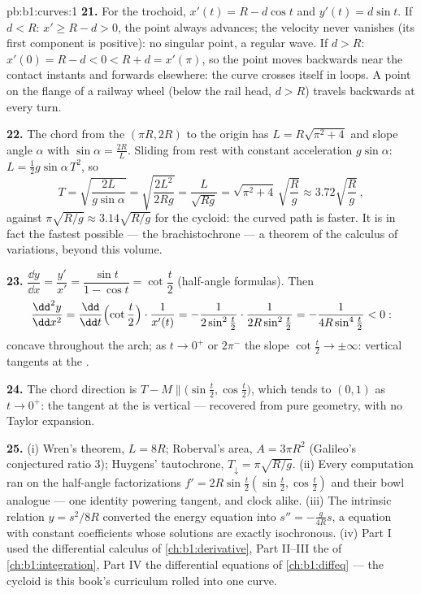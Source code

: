 \begin{solution}{pb:b1:curves:1}
\textbf{21.} For the trochoid, $x'(t) = R - d\cos t$ and $y'(t)
= d\sin t$. If $d < R$: $x' \geq R - d > 0$, the point always
advances; the velocity never vanishes (its first component is
positive): no singular point, a regular wave. If $d > R$: $x'(0)
= R - d < 0 < R + d = x'(\pi)$, so the point moves backwards
near the contact instants and forwards elsewhere: the curve
crosses itself in loops. A point on the flange of a railway
wheel (below the rail head, $d > R$) travels backwards at every
turn.

\textbf{22.} The chord from the  $(\pi R, 2R)$ to the origin
has  $L = R\sqrt{\pi^2 + 4}$ and slope angle $\alpha$ with
$\sin\alpha = \frac{2R}{L}$. Sliding from rest with constant
acceleration $g\sin\alpha$: $L = \frac12 g\sin\alpha\,T^2$, so
\[
T = \sqrt{\frac{2L}{g\sin\alpha}} = \sqrt{\frac{2L^2}{2Rg}}
= \frac{L}{\sqrt{Rg}} = \sqrt{\pi^2 + 4}\,\sqrt{\frac Rg}
\approx 3.72\sqrt{\frac Rg}\,,
\]
against $\pi\sqrt{R/g} \approx 3.14\sqrt{R/g}$ for the cycloid:
the curved path is faster. It is in fact the fastest possible
--- the brachistochrone --- a theorem of the calculus of
variations, beyond this volume.

\textbf{23.} $\dfrac{\dd y}{\dd x} = \dfrac{y'}{x'} =
\dfrac{\sin t}{1 - \cos t} = \cot\dfrac t2$ (half-angle
formulas). Then
\[
\frac{\dd^2y}{\dd x^2}
= \frac{\dd}{\dd t}\Bigl(\cot\frac t2\Bigr)\cdot\frac{1}{x'(t)}
= -\frac{1}{2\sin^2\frac t2}\cdot\frac{1}{2R\sin^2\frac t2}
= -\frac{1}{4R\sin^4\frac t2} < 0 :
\]
concave throughout the arch; as $t \to 0^+$ or $2\pi^-$ the
slope $\cot\frac t2 \to \pm\infty$: vertical tangents at the
.

\textbf{24.} The chord direction is $T - M \parallel
\bigl(\sin\frac t2, \cos\frac t2\bigr)$, which tends to $(0, 1)$
as $t \to 0^{+}$: the tangent at the  is vertical ---
recovered from pure geometry, with no Taylor expansion.

\textbf{25.} (i) Wren's theorem, $L = 8R$; Roberval's area, $A =
3\pi R^2$ (Galileo's conjectured ratio $3$); Huygens'
tautochrone, $T_\downarrow = \pi\sqrt{R/g}$. (ii) Every
computation ran on the half-angle factorizations $f' =
2R\sin\frac t2(\sin\frac t2, \cos\frac t2)$ and their bowl
analogue --- one identity powering tangent,  and clock
alike. (iii) The intrinsic relation $y = s^2/8R$ converted the
energy equation into $s'' = -\frac{g}{4R}s$, a  equation
with constant coefficients whose solutions are exactly
isochronous. (iv) Part I used the differential calculus of
\cref{ch:b1:derivative}, Part II--III the  of
\cref{ch:b1:integration}, Part IV the differential equations of
\cref{ch:b1:diffeq} --- the cycloid is this book's curriculum
rolled into one curve.
\end{solution}
